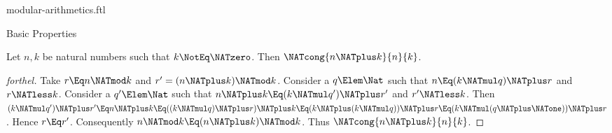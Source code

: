 \documentclass{stex}
\begin{document}
\begin{smodule}{modular-arithmetics.ftl}
\begin{sfragment}{Basic Properties}
  
  \begin{proposition}[forthel,name=congruency of sum]
    Let $n, k$ be natural numbers such that $k \NotEq \NATzero$.
    Then $\NATcong{n \NATplus k}{n}{k}$.
  \end{proposition}
  \begin{proof}[forthel]
    Take $r \Eq n \NATmod k$ and $r' = (n \NATplus k) \NATmod k$.
    Consider a $q \Elem \Nat$ such that $n \Eq (k \NATmul q) \NATplus r$ and $r \NATless k$.
    Consider a $q' \Elem \Nat$ such that $n \NATplus k \Eq (k \NATmul q') \NATplus r'$ and
    $r' \NATless k$.
    Then $(k \NATmul q') \NATplus r'
      \Eq n \NATplus k
      \Eq ((k \NATmul q) \NATplus r) \NATplus k
      \Eq (k \NATplus (k \NATmul q)) \NATplus r
      \Eq (k \NATmul (q \NATplus \NATone)) \NATplus r$.
    Hence $r \Eq r'$.
    Consequently $n \NATmod k \Eq (n \NATplus k) \NATmod k$.
    Thus $\NATcong{n \NATplus k}{n}{k}$.
  \end{proof}
\end{sfragment}
\end{smodule}
\end{document}
